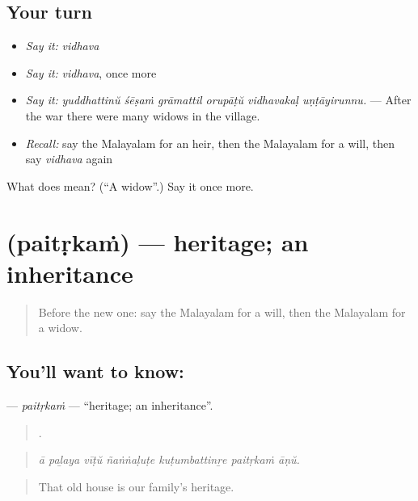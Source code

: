 \subsection*{Your turn}
\begin{itemize}
\raggedright
  \item \emph{Say it:} \emph{vidhava}
  \item \emph{Say it:} \emph{vidhava}, once more
  \item \emph{Say it:} \emph{yuddhattinŭ śēṣaṁ grāmattil orupāṭŭ vidhavakaḷ uṇṭāyirunnu.} — After the war there were many widows in the village.
  \item \emph{Recall:} say the Malayalam for an heir, then the Malayalam for a will, then say \emph{vidhava} again
\end{itemize}

\begin{tcolorbox}[breakable,colback=teal!4,colframe=teal!35!black,title={Before you move on}]
What does  mean? (\textquotedblleft{}A widow\textquotedblright{}.) Say it once more.
\end{tcolorbox}
\section[\texorpdfstring{\ml{പൈതൃകം} (paitṛkaṁ)}{പൈതൃകം (paitṛkaṁ)}]{ (paitṛkaṁ) — heritage; an inheritance}

\label{lesson:ML-C394-paitrkam}



\begin{quote}
Before the new one: say the Malayalam for a will, then the Malayalam for a widow.
\end{quote}

\subsection*{You'll want to know: }
\textbf{} — \emph{paitṛkaṁ} — \textquotedblleft{}heritage; an inheritance\textquotedblright{}.

\begin{quote}
      .
\end{quote}

\begin{quote}
\emph{ā paḻaya vīṭŭ ñaṅṅaḷuṭe kuṭumbattinṟe paitṛkaṁ āṇŭ.}
\end{quote}

\begin{quote}
That old house is our family's heritage.
\end{quote}


